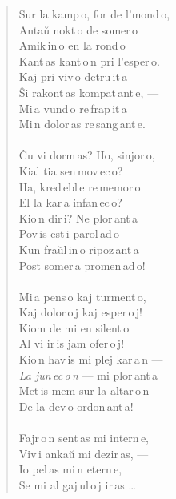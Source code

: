 {


\begin{verse}
        \vin Sur la kamp\,o, for de l’mond\,o,\\
        Antaŭ nokt\,o de somer\,o\\
        Amik\,in\,o en la rond\,o\\
        Kant\,as kant\,o\,n pri l’esper\,o.\\
        Kaj pri viv\,o detru\,it\,a\\
        Ŝi rakont\,as kompat\,ant\,e, ---\\
        Mi\,a vund\,o re\,frap\,it\,a\\
        Mi\,n dolor\,as re\,sang\,ant\,e.\\
\pstars\\
        \vin \glqq{}Ĉu vi dorm\,as? Ho, sinjor\,o,\\
        Kial tia sen\,mov\,ec\,o?\\
        Ha, kred\,ebl\,e re\,memor\,o\\
        El la kar\,a infan\,ec\,o?\grqq{}\\
        Kio\,n dir\,i? Ne plor\,ant\,a\\
        Pov\,is est\,i parol\,ad\,o\\
        Kun fraŭl\,in\,o ripoz\,ant\,a\\
        Post somer\,a promen\,ad\,o!\\
\pstars\\[0.5ex]
        \vin Mi\,a pens\,o kaj turment\,o,\\
        Kaj dolor\,o\,j kaj esper\,o\,j!\\
        Kiom de mi en silent\,o\\
        Al vi ir\,is jam ofer\,o\,j!\\
        Kio\,n hav\,is mi plej kar\,a\,n ---\\
        \emph{La jun\,ec\,o\,n} --- mi plor\,ant\,a\\
        Met\,is mem sur la altar\,o\,n\\
        De la dev\,o ordon\,ant\,a!\\
\pstars\\
        \vin Fajr\,o\,n sent\,as mi intern\,e,\\
        Viv\,i ankaŭ mi dezir\,as, ---\\
        Io pel\,as mi\,n etern\,e,\\
        Se mi al gaj\,ul\,o\,j ir\,as \ldots{} \\

\end{verse}}

